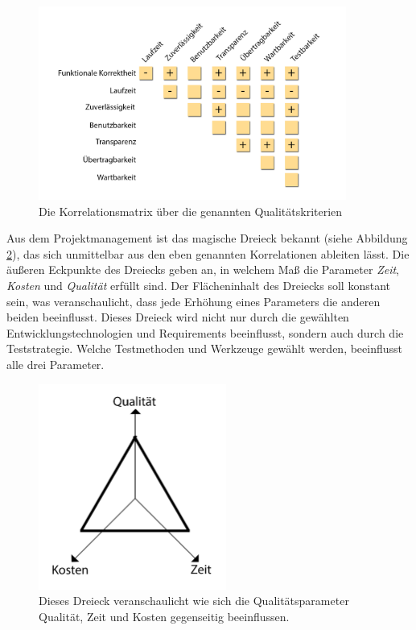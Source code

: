 \begin{figure}[h] 
  \centering
     \includegraphics[width=0.9\textwidth]{figures/korrelationsmatrix.png}
  \caption{Die Korrelationsmatrix über die genannten Qualitätskriterien \cite{hoffmann_software-qualitat_2013}}
  \label{fig:korrelationsmatrix}
\end{figure}

Aus dem Projektmanagement ist das magische Dreieck bekannt (siehe Abbildung \ref{fig:magic_triangle}), das sich unmittelbar aus den eben genannten Korrelationen ableiten lässt. Die äußeren Eckpunkte des Dreiecks geben an, in welchem Maß die Parameter \textit{Zeit}, \textit{Kosten} und \textit{Qualität} erfüllt sind. Der Flächeninhalt des Dreiecks soll konstant sein, was veranschaulicht, dass jede Erhöhung eines Parameters die anderen beiden beeinflusst. Dieses Dreieck wird nicht nur durch die gewählten Entwicklungstechnologien und Requirements beeinflusst, sondern auch durch die Teststrategie. Welche Testmethoden und Werkzeuge gewählt werden, beeinflusst alle drei Parameter.

\begin{figure}[h] 
  \centering
     \includegraphics[width=0.55\textwidth]{figures/magic_triangle.png}
  \caption{Dieses Dreieck veranschaulicht wie sich die Qualitätsparameter Qualität, Zeit und Kosten gegenseitig beeinflussen.}
  \label{fig:magic_triangle}
\end{figure}


